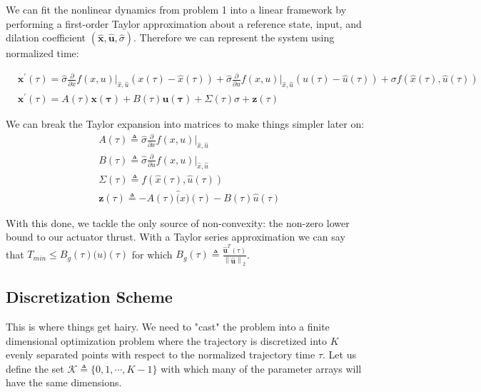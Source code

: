 \documentclass[conf]{new-aiaa}
\begin{document}
\begin{singlespace}
We can fit the nonlinear dynamics from problem 1 into a linear framework by performing a first-order Taylor approximation about a reference state, input, and dilation coefficient $(\hat{\mathbf{x}}, \hat{\mathbf{u}}, \hat{\sigma})$. Therefore we can represent the system using normalized time:

\begin{align}
& \mathbf{x}^\prime(\tau) = \hat{\sigma}\frac{\partial}{\partial x} f(x,u) \bigg\rvert_{\hat{x},\hat{u}}(x(\tau)-\hat{x}(\tau)) + \hat{\sigma}\frac{\partial}{\partial u} f(x,u) \bigg\rvert_{\hat{x},\hat{u}}(u(\tau)-\hat{u}(\tau)) + \sigma f(\hat{x}(\tau),\hat{u}(\tau)) \\
& \mathbf{x}^\prime(\tau) = A(\tau)\mathbf{x(\tau)} + B(\tau)\mathbf{u(\tau)} + \Sigma(\tau)\sigma + \mathbf{z}(\tau)
\end{align}

We can break the Taylor expansion into matrices to make things simpler later on:
\begin{align}
& A(\tau) \triangleq \hat{\sigma} \frac{\partial}{\partial x} f(x,u) \bigg\rvert_{\hat{x},\hat{u}} \\
& B(\tau) \triangleq \hat{\sigma} \frac{\partial}{\partial u} f(x,u) \bigg\rvert_{\hat{x},\hat{u}} \\
& \Sigma(\tau) \triangleq f(\hat{x}(\tau),\hat{u}(\tau)) \\
& \mathbf{z}(\tau) \triangleq -A(\tau)\hat(x)(\tau) - B(\tau)\hat{u}(\tau)
\end{align}

With this done, we tackle the only source of non-convexity: the non-zero lower bound to our actuator thrust. With a Taylor series approximation we can say that $T_{min} \leq B_g(\tau)\mathbf(u)(\tau)$ for which $B_g(\tau) \triangleq \frac{\mathbf{\hat{u}}^T(\tau)}{\left\lVert \mathbf{\hat{u}} \right \lVert_2}$.



\subsection{Discretization Scheme}
This is where things get hairy. We need to "cast" the problem into a finite dimensional optimization problem where the trajectory is discretized into $K$ evenly separated points with respect to the normalized trajectory time $\tau$. Let us define the set $\mathcal{K}\triangleq \{0,1,\cdots, K-1\}$ with which many of the parameter arrays will have the same dimensions.


\end{singlespace}
\end{document}

